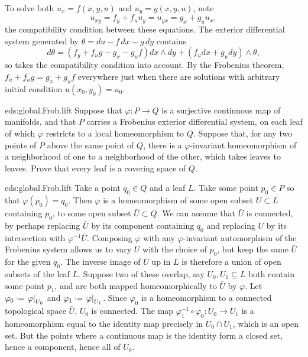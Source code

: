 \begin{example}
To solve both \(u_x=f(x,y,u)\) and \(u_y=g(x,y,u)\), note
\[
u_{xy}=f_y+f_uu_y=u_{yx}=g_x+g_uu_x,
\]
the compatibility condition between these equations.
The exterior differential system generated by \(\theta=du-f\,dx-g\,dy\) contains 
\[
d\theta=(f_y+f_ug-g_x-g_uf)dx\wedge dy+(f_udx+g_udy)\wedge\theta,
\]
so takes the compatibility condition into account.
By the Frobenius theorem, \(f_u+f_ug=g_x+g_uf\) everywhere just when there are solutions with arbitrary initial condition \(u(x_0,y_0)=u_0\).
\end{example}
\begin{problem}{eds:global.Frob.lift}
Suppose that \(\varphi \colon P \to Q\) is a surjective continuous map of manifolds, and that \(P\) carries a Frobenius exterior differential system, on each leaf of which \(\varphi\) restricts to a local homeomorphism to \(Q\).
Suppose that, for any two points of \(P\) above the same point of \(Q\), there is a \(\varphi\)-invariant homeomorphism of a neighborhood of one to a neighborhood of the other, which takes leaves to leaves.
Prove that every leaf is a covering space of \(Q\).
\end{problem}
\begin{answer}{eds:global.Frob.lift}
Take a point \(q_0 \in Q\) and a leaf \(L\).
Take some point \(p_0 \in P\) so that \(\varphi(p_0)=q_0\).
Then \(\varphi\) is a homeomorphism of some open subset \(U\subset L\) containing \(p_0\), to some open subset \(\bar{U}\subset Q\).
We can assume that \(\bar{U}\) is connected, by perhaps replacing \(\bar{U}\) by its component containing \(q_0\) and replacing \(U\) by its intersection with \(\varphi^{-1}\bar{U}\).
Composing \(\varphi\) with any \(\varphi\)-invariant automorphism of the Frobenius system allows us to vary \(U\) with the choice of \(p_0\), but keep the same \(\bar{U}\) for the given \(q_0\).
The inverse image of \(\bar{U}\) up in \(L\) is therefore a union of open subsets of the leaf \(L\).
Suppose two of these overlap, say \(U_0,U_1\subseteq L\) both contain some point \(p_1\), and are both mapped homeomorphically to \(\bar{U}\) by \(\varphi\).
Let \(\varphi_0\defeq\left.\varphi\right|_{U_0}\) and \(\varphi_1\defeq\left.\varphi\right|_{U_1}\).
Since \(\varphi_0\) is a homeomorphism to a connected topological space \(\bar{U}\), \(U_0\) is connected. 
The map \(\varphi_1^{-1}\circ\varphi_0\colon U_0\to U_1\) is a homeomorphism equal to the identity map precisely in \(U_0\cap U_1\), which is an open set.
But the points where a continuous map is the identity form a closed set, hence a component, hence all of \(U_0\).
\end{answer}
